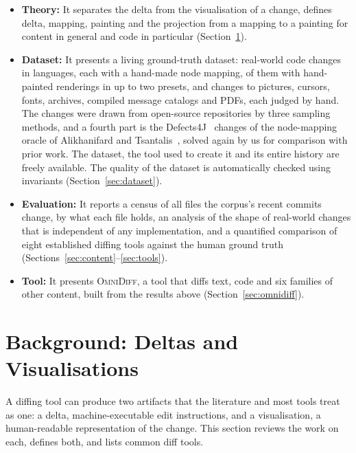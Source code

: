 \documentclass[sigconf,review]{acmart}
\begin{document}
\begin{itemize}
  \item \textbf{Theory:} It separates the delta from the visualisation of a change, defines
    delta, mapping, painting and the projection from a mapping to a painting for content in
    general and code in particular (Section~\ref{sec:background}).
  \item \textbf{Dataset:} It presents a living ground-truth dataset: \NumFixtures{} real-world
    code changes in \NumFixtureLanguages{} languages, each with a hand-made node mapping,
    \PresetPainted{} of them with hand-painted renderings in up to two presets, and
    \ContentAccAllJudged{} changes to pictures, cursors, fonts, archives, compiled message
    catalogs and PDFs, each judged by hand. The changes were drawn from
    \NumRepos{} open-source repositories by three sampling methods, and a fourth part is the
    Defects4J~\cite{defects4j} changes of the node-mapping oracle of Alikhanifard and
    Tsantalis~\cite{astdiffbenchmark}, solved again by us for comparison with prior work. The
    dataset, the tool used to create it and its entire history are freely available. The quality
    of the dataset is automatically checked using \InvariantCount{} invariants (Section~\ref{sec:dataset}).
  \item \textbf{Evaluation:} It reports a census of all \ContentCensusChanges{} files the
    corpus's recent commits change, by what each file holds, an analysis of the shape of
    real-world changes that is independent of any implementation, and a quantified comparison of
    eight established diffing tools against the human ground truth
    (Sections~\ref{sec:content}--\ref{sec:tools}).
  \item \textbf{Tool:} It presents \textsc{OmniDiff}, a tool that diffs text, code and six
    families of other content, built from the results above
    (Section~\ref{sec:omnidiff}).
\end{itemize}

\section{Background: Deltas and Visualisations}
\label{sec:background}

A diffing tool can produce two artifacts that the literature and most tools treat as one: a
delta, machine-executable edit instructions, and a visualisation, a human-readable representation
of the change. This section reviews the work on each, defines both, and lists common diff tools.
\end{document}
